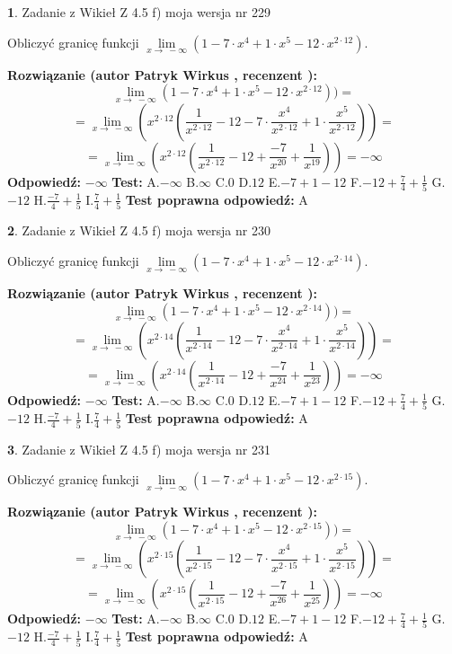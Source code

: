 \documentclass[12pt, a4paper]{article}
\theoremstyle{definition} %
\newtheorem{zad}{}
\newcommand{\zadStart}[1]{\begin{zad}#1\newline}
\newcommand{\zadStop}{\end{zad}}
\newcommand{\rozwStart}[2]{\noindent \textbf{Rozwiązanie (autor #1 , recenzent #2): }\newline}
\newcommand{\rozwStop}{\newline}
\newcommand{\odpStart}{\noindent \textbf{Odpowiedź:}\newline}
\newcommand{\odpStop}{\newline}
\newcommand{\testStart}{\noindent \textbf{Test:}\newline}
\newcommand{\testStop}{\newline}
\newcommand{\kluczStart}{\noindent \textbf{Test poprawna odpowiedź:}\newline}
\newcommand{\kluczStop}{\newline}
\begin{document}
\zadStart{Zadanie z Wikieł Z 4.5 f) moja wersja nr 229}



Obliczyć granicę funkcji  $\lim\limits_{x\to\ -\infty}(1 - 7 \cdot x^{4}+1 \cdot x^{5}- 12 \cdot x^{2\cdot12})$.
\zadStop
\rozwStart{Patryk Wirkus}{}
$$\lim\limits_{x\to\ -\infty}(1 - 7 \cdot x^{4}+1 \cdot x^{5}- 12 \cdot x^{2\cdot12}))=$$
$$=\lim\limits_{x\to\ -\infty}(x^{2\cdot12}(\frac{1}{x^{2\cdot12}}-12 -7 \cdot \frac{x^{4}}{x^{2\cdot12}}+1 \cdot \frac{x^{5}}{x^{2\cdot12}}))=$$
$$=\lim\limits_{x\to\ -\infty}(x^{2\cdot12}(\frac{1}{x^{2\cdot12}}-12 + \frac{-7}{x^{20}}+ \frac{1}{x^{19}}))=-\infty$$
\rozwStop
\odpStart
$-\infty$
\odpStop
\testStart
A.$-\infty$ B.$\infty$ C.$0$ D.$12$ E.$-7 + 1 - 12$
F.$-12+\frac{7}{4}+\frac{1}{5}$ G.$-12$
H.$\frac{-7}{4}+\frac{1}{5}$
I.$\frac{7}{4}+\frac{1}{5}$
\testStop
\kluczStart
A
\kluczStop



\zadStart{Zadanie z Wikieł Z 4.5 f) moja wersja nr 230}



Obliczyć granicę funkcji  $\lim\limits_{x\to\ -\infty}(1 - 7 \cdot x^{4}+1 \cdot x^{5}- 12 \cdot x^{2\cdot14})$.
\zadStop
\rozwStart{Patryk Wirkus}{}
$$\lim\limits_{x\to\ -\infty}(1 - 7 \cdot x^{4}+1 \cdot x^{5}- 12 \cdot x^{2\cdot14}))=$$
$$=\lim\limits_{x\to\ -\infty}(x^{2\cdot14}(\frac{1}{x^{2\cdot14}}-12 -7 \cdot \frac{x^{4}}{x^{2\cdot14}}+1 \cdot \frac{x^{5}}{x^{2\cdot14}}))=$$
$$=\lim\limits_{x\to\ -\infty}(x^{2\cdot14}(\frac{1}{x^{2\cdot14}}-12 + \frac{-7}{x^{24}}+ \frac{1}{x^{23}}))=-\infty$$
\rozwStop
\odpStart
$-\infty$
\odpStop
\testStart
A.$-\infty$ B.$\infty$ C.$0$ D.$12$ E.$-7 + 1 - 12$
F.$-12+\frac{7}{4}+\frac{1}{5}$ G.$-12$
H.$\frac{-7}{4}+\frac{1}{5}$
I.$\frac{7}{4}+\frac{1}{5}$
\testStop
\kluczStart
A
\kluczStop



\zadStart{Zadanie z Wikieł Z 4.5 f) moja wersja nr 231}



Obliczyć granicę funkcji  $\lim\limits_{x\to\ -\infty}(1 - 7 \cdot x^{4}+1 \cdot x^{5}- 12 \cdot x^{2\cdot15})$.
\zadStop
\rozwStart{Patryk Wirkus}{}
$$\lim\limits_{x\to\ -\infty}(1 - 7 \cdot x^{4}+1 \cdot x^{5}- 12 \cdot x^{2\cdot15}))=$$
$$=\lim\limits_{x\to\ -\infty}(x^{2\cdot15}(\frac{1}{x^{2\cdot15}}-12 -7 \cdot \frac{x^{4}}{x^{2\cdot15}}+1 \cdot \frac{x^{5}}{x^{2\cdot15}}))=$$
$$=\lim\limits_{x\to\ -\infty}(x^{2\cdot15}(\frac{1}{x^{2\cdot15}}-12 + \frac{-7}{x^{26}}+ \frac{1}{x^{25}}))=-\infty$$
\rozwStop
\odpStart
$-\infty$
\odpStop
\testStart
A.$-\infty$ B.$\infty$ C.$0$ D.$12$ E.$-7 + 1 - 12$
F.$-12+\frac{7}{4}+\frac{1}{5}$ G.$-12$
H.$\frac{-7}{4}+\frac{1}{5}$
I.$\frac{7}{4}+\frac{1}{5}$
\testStop
\kluczStart
A
\kluczStop
\end{document}

